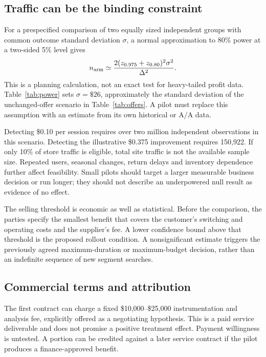 \documentclass[11pt]{article}
\theoremstyle{remark}\newtheorem{example}{Example}
\begin{document}
\subsection{Traffic can be the binding constraint}
For a prespecified comparison of two equally sized independent groups with
common outcome standard deviation $\sigma$, a normal approximation to 80\%
power at a two-sided 5\% level gives
\begin{equation}\label{eq:power}
 n_{\rm arm}\simeq
 \frac{2(z_{0.975}+z_{0.80})^2\sigma^2}{\Delta^2}.
\end{equation}
This is a planning calculation, not an exact test for heavy-tailed profit data.
Table~\ref{tab:power} sets $\sigma=\$26$, approximately the standard deviation
of the unchanged-offer scenario in Table~\ref{tab:offers}. A pilot must replace
this assumption with an estimate from its own historical or A/A data.

\begin{table}[htbp]\centering\small

\caption{Illustrative sample sizes for a fixed two-policy comparison, 80\%
power, two-sided 5\% level and \$26 standard deviation per independent unit.
These do not include policy-learning samples or a multiple-comparison penalty.}
\label{tab:power}
\end{table}

Detecting \$0.10 per session requires over two million independent observations
in this scenario. Detecting the illustrative \$0.375 improvement requires
150,922. If only 10\% of store traffic is eligible, total site traffic is not
the available sample size. Repeated users, seasonal changes, return delays and
inventory dependence further affect feasibility. Small pilots should target a
larger measurable business decision or run longer; they should not describe an
underpowered null result as evidence of no effect.

The selling threshold is economic as well as statistical. Before the comparison,
the parties specify the smallest benefit that covers the customer's switching
and operating costs and the supplier's fee. A lower confidence bound above that
threshold is the proposed rollout condition. A nonsignificant estimate triggers
the previously agreed maximum-duration or maximum-budget decision, rather than
an indefinite sequence of new segment searches.

\subsection{Commercial terms and attribution}
The first contract can charge a fixed \$10,000--\$25,000 instrumentation and
analysis fee, explicitly offered as a negotiating hypothesis. This is a paid
service deliverable and does not promise a positive treatment effect. Payment
willingness is untested. A portion can be credited against a later service
contract if the pilot produces a finance-approved benefit.
\end{document}
